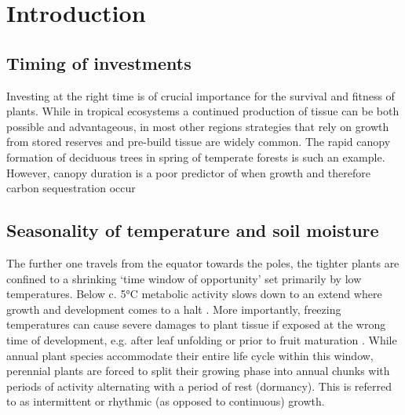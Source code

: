 \documentclass{article}
\begin{document}
\section*{Introduction}
	
	\subsection*{Timing of investments}
		Investing at the right time is of crucial importance for the survival and fitness of plants. While in tropical ecosystems a continued production of tissue can be both possible and advantageous, in most other regions strategies that rely on growth from stored reserves and pre-build tissue are widely common. The rapid canopy formation of deciduous trees in spring of temperate forests is such an example. However, canopy duration is a poor predictor of when growth and therefore carbon sequestration occur

	\subsection*{Seasonality of temperature and soil moisture}
		The further one travels from the equator towards the poles, the tighter plants are confined to a shrinking ‘time window of opportunity’ set primarily by low temperatures. Below c. 5°C  metabolic activity slows down to an extend where growth and development comes to a halt \citep{schenkerPhysiologicalMinimumTemperatures2014, rossiCriticalTemperaturesXylogenesis2008, kornerWinterCropGrowth2008}. More importantly, freezing temperatures can cause severe damages to plant tissue if exposed at the wrong time of development, e.g. after leaf unfolding or prior to fruit maturation \citep{baumgartenNoRiskNo2023a}. While annual plant species accommodate their entire life cycle within this window, perennial plants are forced to split their growing phase into annual chunks with periods of activity alternating with a period of rest (dormancy). This is referred to as intermittent or rhythmic (as opposed to continuous) growth. \\
		
\end{document}

